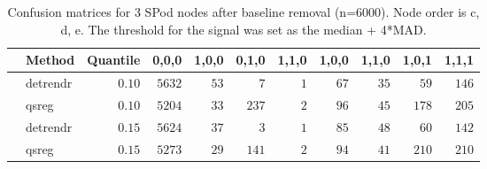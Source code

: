 \begin{table}[!tbp]
\caption{Confusion matrices for 3 SPod nodes after baseline 
      removal (n=6000). Node order is c, d, e. The threshold for the signal was 
      set as the median + 4*MAD.\label{confusion}} 
\begin{center}
\begin{tabular}{llrrrrrrrrr}
\hline\hline
\multicolumn{1}{l}{}&\multicolumn{1}{c}{Method}&\multicolumn{1}{c}{Quantile}&\multicolumn{1}{c}{0,0,0}&\multicolumn{1}{c}{1,0,0}&\multicolumn{1}{c}{0,1,0}&\multicolumn{1}{c}{1,1,0}&\multicolumn{1}{c}{1,0,0}&\multicolumn{1}{c}{1,1,0}&\multicolumn{1}{c}{1,0,1}&\multicolumn{1}{c}{1,1,1}\tabularnewline
\hline
&detrendr&$0.10$&$5632$&$53$&$  7$&$1$&$67$&$35$&$ 59$&$146$\tabularnewline
&qsreg&$0.10$&$5204$&$33$&$237$&$2$&$96$&$45$&$178$&$205$\tabularnewline
&detrendr&$0.15$&$5624$&$37$&$  3$&$1$&$85$&$48$&$ 60$&$142$\tabularnewline
&qsreg&$0.15$&$5273$&$29$&$141$&$2$&$94$&$41$&$210$&$210$\tabularnewline
\hline
\end{tabular}\end{center}
\end{table}
